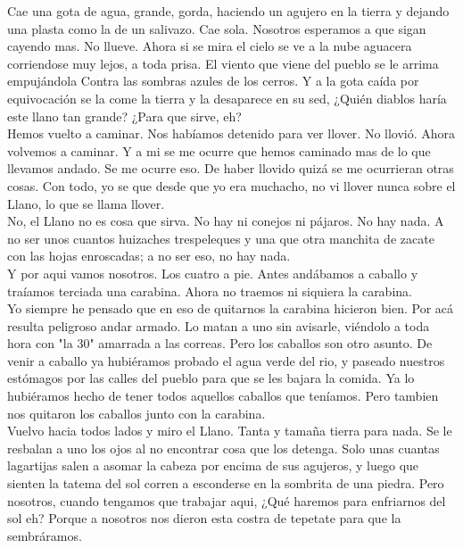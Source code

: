 \documentclass{article}
\theoremstyle{mytheoremstyle}
\theoremstyle{mytheoremstyle}
\theoremstyle{myproblemstyle}
\begin{document}
Cae una gota de agua, grande, gorda, haciendo un agujero en la tierra y dejando una plasta  como la de un salivazo. Cae sola. Nosotros esperamos a que sigan cayendo mas. No llueve.  Ahora si se mira el cielo se ve a la nube aguacera corriendose muy lejos, a toda prisa. El viento  que viene del pueblo se le arrima empujándola Contra las sombras azules de los cerros. Y a la gota caída por equivocación se la come la tierra y la desaparece en su sed, ¿Quién diablos haría este llano tan grande? ¿Para que sirve, eh?\\

Hemos vuelto a caminar. Nos habíamos detenido para ver llover. No llovió. Ahora volvemos a  caminar. Y a mi se me ocurre que hemos caminado mas de lo que llevamos andado. Se me  ocurre eso. De haber llovido quizá se me ocurrieran otras cosas. Con todo, yo se que desde que yo era muchacho, no vi llover nunca sobre el Llano, lo que se llama llover.  \\

No, el Llano no es cosa que sirva. No hay ni conejos ni pájaros. No hay nada. A no ser unos cuantos huizaches trespeleques y una que otra manchita de zacate con las hojas enroscadas; a no ser eso, no hay nada.  \\

Y por aqui vamos nosotros. Los cuatro a pie. Antes andábamos a caballo y traíamos terciada  una carabina. Ahora no traemos ni siquiera la carabina.  \\

Yo siempre he pensado que en eso de quitarnos la carabina hicieron bien. Por acá resulta  peligroso andar armado. Lo matan a uno sin avisarle, viéndolo a toda hora con "la 30"  amarrada a las correas. Pero los caballos son otro asunto. De venir a caballo ya hubiéramos  probado el agua verde del rio, y paseado nuestros estómagos por las calles del pueblo para que se les bajara la comida. Ya lo hubiéramos hecho de tener todos aquellos caballos que  teníamos. Pero tambien nos quitaron los caballos junto con la carabina.  \\

Vuelvo hacia todos lados y miro el Llano. Tanta y tamaña tierra para nada. Se le resbalan a uno los ojos al no encontrar cosa que los detenga. Solo unas cuantas lagartijas salen a asomar la  cabeza por encima de sus agujeros, y luego que sienten la tatema del sol corren a esconderse  en la sombrita de una piedra. Pero nosotros, cuando tengamos que trabajar aqui, ¿Qué haremos para enfriarnos del sol eh? Porque a nosotros nos dieron esta costra de tepetate para que la sembráramos.  \\
\end{document}
